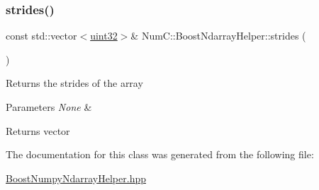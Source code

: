 \subsubsection{\texorpdfstring{strides()}{strides()}}
{\footnotesize\ttfamily const std\+::vector$<$\mbox{\hyperlink{namespace_num_c_ae685802ca6d3035f2b400b081e3953fa}{uint32}}$>$\& Num\+C\+::\+Boost\+Ndarray\+Helper\+::strides (\begin{DoxyParamCaption}{ }\end{DoxyParamCaption})\hspace{0.3cm}{\ttfamily [inline]}}

Returns the strides of the array


\begin{DoxyParams}{Parameters}
{\em None} & \\
\hline
\end{DoxyParams}
\begin{DoxyReturn}{Returns}
vector 
\end{DoxyReturn}


The documentation for this class was generated from the following file\+:\begin{DoxyCompactItemize}
\item 
\mbox{\hyperlink{_boost_numpy_ndarray_helper_8hpp}{Boost\+Numpy\+Ndarray\+Helper.\+hpp}}\end{DoxyCompactItemize}
